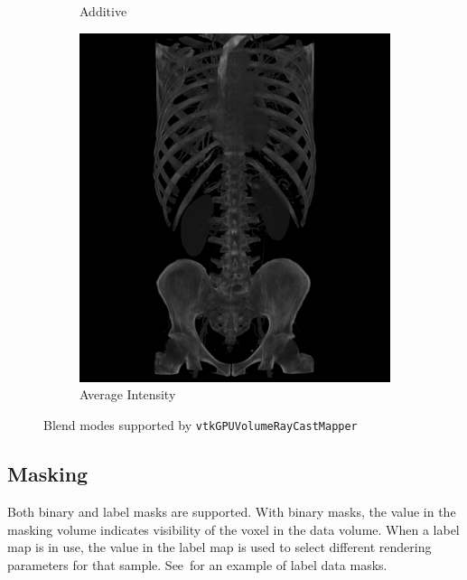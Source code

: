 \begin{figure}[htb]
\begin{subfigure}{.5\columnwidth}
    \caption{Additive}
    \label{fig:blendadditive}
  \end{subfigure}%
  \begin{subfigure}{.5\columnwidth}
    \includegraphics[width=\columnwidth]{TorsoBlendingAverage}
    \caption{Average Intensity}
    \label{fig:blendaverage}
  \end{subfigure}%
  \caption{Blend modes supported by \texttt{vtkGPUVolumeRayCastMapper}}
  \label{fig:blendingmodes}
\end{figure}

\subsection{Masking}
\label{masking}
Both binary and label masks are supported. With binary masks, the value in the
masking volume indicates visibility of the voxel in the data volume. When a
label map is in use, the value in the label map is used to select different
rendering parameters for that sample.  See~for an
example of label data masks.

